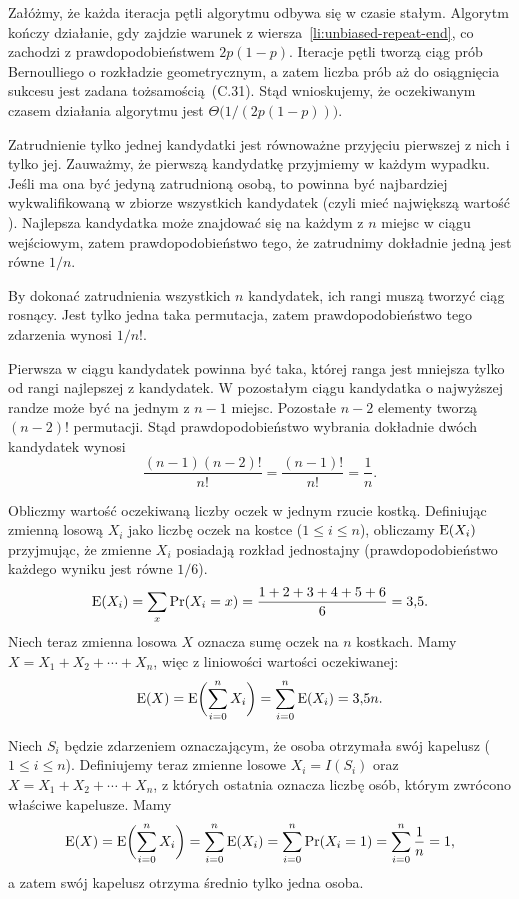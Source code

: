 Załóżmy, że każda iteracja pętli algorytmu odbywa się w czasie stałym. Algorytm kończy działanie, gdy zajdzie warunek z wiersza~\ref{li:unbiased-repeat-end}, co zachodzi z prawdopodobieństwem $2p(1-p)$. Iteracje pętli tworzą ciąg prób Bernoulliego o rozkładzie geometrycznym, a zatem liczba prób aż do osiągnięcia sukcesu jest zadana tożsamością~(C.31). Stąd wnioskujemy, że oczekiwanym czasem działania algorytmu jest $\Theta\bigl(1/(2p(1-p))\bigr)$.


\exercise{} %
\noindent Zatrudnienie tylko jednej kandydatki jest równoważne przyjęciu pierwszej z nich i tylko jej. Zauważmy, że pierwszą kandydatkę przyjmiemy w każdym wypadku. Jeśli ma ona być jedyną zatrudnioną osobą, to powinna być najbardziej wykwalifikowaną w zbiorze wszystkich kandydatek (czyli mieć największą wartość ). Najlepsza kandydatka może znajdować się na każdym z $n$ miejsc w ciągu wejściowym, zatem prawdopodobieństwo tego, że zatrudnimy dokładnie jedną jest równe $1/n$.

By dokonać zatrudnienia wszystkich $n$ kandydatek, ich rangi muszą tworzyć ciąg rosnący. Jest tylko jedna taka permutacja, zatem prawdopodobieństwo tego zdarzenia wynosi $1/n!$.

\exercise{} %
\noindent Pierwsza w ciągu kandydatek powinna być taka, której ranga jest mniejsza tylko od rangi najlepszej z kandydatek. W pozostałym  ciągu kandydatka o najwyższej randze może być na jednym z $n-1$ miejsc. Pozostałe $n-2$ elementy tworzą $(n-2)!$ permutacji. Stąd prawdopodobieństwo wybrania dokładnie dwóch kandydatek wynosi
\[
	\frac{(n-1)(n-2)!}{n!} = \frac{(n-1)!}{n!} = \frac{1}{n}.
\]

\exercise{} %
\noindent Obliczmy wartość oczekiwaną liczby oczek w jednym rzucie kostką. Definiując zmienną losową $X_i$ jako liczbę oczek na  kostce ($1\le i\le n$), obliczamy $\operatorname{E}(X_i)$ przyjmując, że zmienne $X_i$ posiadają rozkład jednostajny (prawdopodobieństwo każdego wyniku jest równe $1/6$).
\[
	\operatorname{E}(X_i) = \sum_x\Pr(X_i=x) = \frac{1+2+3+4+5+6}{6} = 3{,}5.
\]
Niech teraz zmienna losowa $X$ oznacza sumę oczek na $n$ kostkach. Mamy $X=X_1+X_2+\cdots+X_n$, więc z liniowości wartości oczekiwanej:
\[
	\operatorname{E}(X) = \operatorname{E}\biggl(\sum_{i=0}^nX_i\biggr) = \sum_{i=0}^n\operatorname{E}(X_i) = 3{,}5n.
\]

\exercise{} %
\noindent Niech $S_i$ będzie zdarzeniem oznaczającym, że  osoba otrzymała swój kapelusz ($1\le i\le n$). Definiujemy teraz zmienne losowe $X_i=I(S_i)$ oraz $X=X_1+X_2+\cdots+X_n$, z których ostatnia oznacza liczbę osób, którym zwrócono właściwe kapelusze. Mamy
\[
	\operatorname{E}(X) = \operatorname{E}\biggl(\sum_{i=0}^nX_i\biggr) = \sum_{i=0}^n\operatorname{E}(X_i) = \sum_{i=0}^n\Pr(X_i=1) = \sum_{i=0}^n\frac{1}{n} = 1,
\]
a zatem swój kapelusz otrzyma średnio tylko jedna osoba.

